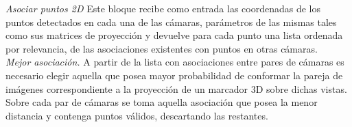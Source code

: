 \textit{Asociar puntos 2D}\label{seccion_asociar2D_uno}
%
Este bloque recibe como entrada las coordenadas de los puntos detectados en cada una de las cámaras, parámetros de las mismas tales como sus matrices de proyección y devuelve para cada punto una lista ordenada por relevancia, de las asociaciones existentes con puntos en otras cámaras.\\ 
\textit{\hspace*{0.5cm}Mejor asociación.}\label{MejorAsociacion}
%
A partir de la lista con asociaciones entre pares de cámaras es necesario elegir aquella que posea mayor probabilidad de conformar la pareja de imágenes correspondiente a la proyección de un marcador 3D sobre dichas vistas.
%
Sobre cada par de cámaras se toma aquella asociación que posea la menor distancia y contenga puntos válidos, descartando las restantes. %
